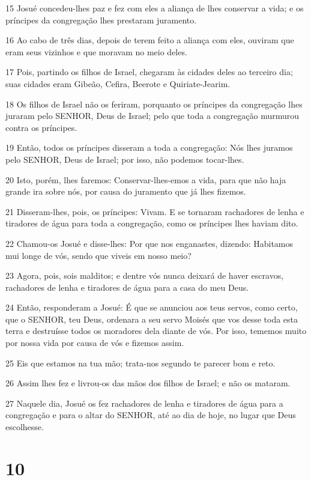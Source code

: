 \par 15 Josué concedeu-lhes paz e fez com eles a aliança de lhes conservar a vida; e os príncipes da congregação lhes prestaram juramento.
\par 16 Ao cabo de três dias, depois de terem feito a aliança com eles, ouviram que eram seus vizinhos e que moravam no meio deles.
\par 17 Pois, partindo os filhos de Israel, chegaram às cidades deles ao terceiro dia; suas cidades eram Gibeão, Cefira, Beerote e Quiriate-Jearim.
\par 18 Os filhos de Israel não os feriram, porquanto os príncipes da congregação lhes juraram pelo SENHOR, Deus de Israel; pelo que toda a congregação murmurou contra os príncipes.
\par 19 Então, todos os príncipes disseram a toda a congregação: Nós lhes juramos pelo SENHOR, Deus de Israel; por isso, não podemos tocar-lhes.
\par 20 Isto, porém, lhes faremos: Conservar-lhes-emos a vida, para que não haja grande ira sobre nós, por causa do juramento que já lhes fizemos.
\par 21 Disseram-lhes, pois, os príncipes: Vivam. E se tornaram rachadores de lenha e tiradores de água para toda a congregação, como os príncipes lhes haviam dito.
\par 22 Chamou-os Josué e disse-lhes: Por que nos enganastes, dizendo: Habitamos mui longe de vós, sendo que viveis em nosso meio?
\par 23 Agora, pois, sois malditos; e dentre vós nunca deixará de haver escravos, rachadores de lenha e tiradores de água para a casa do meu Deus.
\par 24 Então, responderam a Josué: É que se anunciou aos teus servos, como certo, que o SENHOR, teu Deus, ordenara a seu servo Moisés que vos desse toda esta terra e destruísse todos os moradores dela diante de vós. Por isso, tememos muito por nossa vida por causa de vós e fizemos assim.
\par 25 Eis que estamos na tua mão; trata-nos segundo te parecer bom e reto.
\par 26 Assim lhes fez e livrou-os das mãos dos filhos de Israel; e não os mataram.
\par 27 Naquele dia, Josué os fez rachadores de lenha e tiradores de água para a congregação e para o altar do SENHOR, até ao dia de hoje, no lugar que Deus escolhesse.

\chapter{10}

